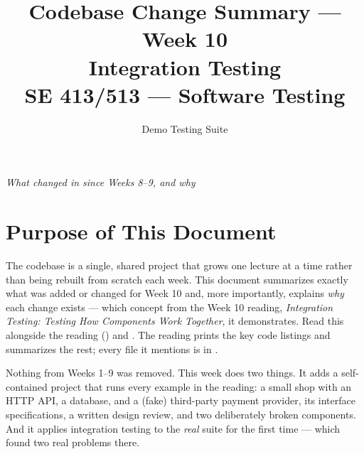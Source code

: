 \documentclass[11pt]{article}
\title{
  \textbf{Codebase Change Summary --- Week 10}\\[4pt]
  \large Integration Testing\\[2pt]
  \normalsize SE 413/513 --- Software Testing
}
\author{Demo Testing Suite}
\date{}
\begin{document}
\maketitle

\begin{center}
\textit{What changed in  since Weeks 8--9, and why}
\end{center}

\vspace{0.3cm}

\section{Purpose of This Document}
The  codebase is a single, shared project that
grows one lecture at a time rather than being rebuilt from scratch each
week. This document summarizes exactly what was added or changed for
Week 10 and, more importantly, explains \emph{why} each change exists ---
which concept from the Week 10 reading, \textit{Integration Testing:
Testing How Components Work Together}, it demonstrates. Read this
alongside the reading ()
and . The reading prints the key code
listings and summarizes the rest; every file it mentions is in
.

\begin{keyidea}
Nothing from Weeks 1--9 was removed. This week does two things. It adds
a self-contained project that runs every example in the reading: a
small shop with an HTTP API, a database, and a (fake) third-party
payment provider, its interface specifications, a written design
review, and two deliberately broken components. And it applies
integration testing to the \emph{real} suite for the first time ---
which found two real problems there.
\end{keyidea}

\end{document}
